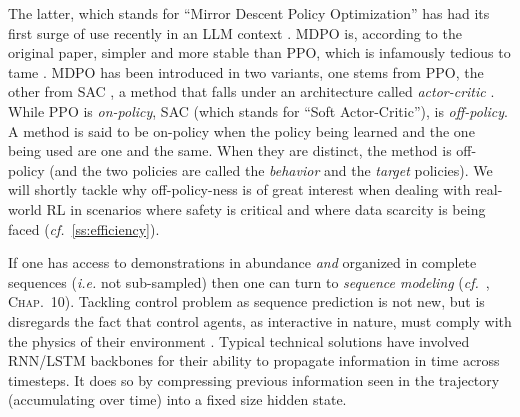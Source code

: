 \documentclass[12pt,a4paper]{article}
\begin{document}
The latter, which stands for ``Mirror Descent Policy Optimization'' has had its first surge of use
recently in an LLM context \cite{Gunter2024-hu}.
MDPO is, according to the original paper, simpler and more stable than PPO, which is infamously
tedious to tame \cite{Engstrom2019-jt, Huang2022-bv, Moalla2024-xq}.
MDPO has been introduced in two variants, one stems from PPO,
the other from SAC \cite{Haarnoja2018-bm, Haarnoja2018-uo},
a method that falls under an architecture called \textit{actor-critic}
\cite{Crites1995-hn, Konda2000-ef, Sutton2001-vh}.
While PPO is \textit{on-policy}, SAC (which stands for ``Soft Actor-Critic''),
is \textit{off-policy}.
A method is said to be on-policy when the policy being learned and the one being used are one and
the same. When they are distinct, the method is off-policy (and the two policies are called the
\textit{behavior} and the \textit{target} policies).
We will shortly tackle why off-policy-ness is of great interest when dealing with real-world RL
in scenarios where safety is critical and where data scarcity is being faced
(\textit{cf.}~\ref{ss:efficiency}).

If one has access to demonstrations in abundance \emph{and} organized in complete sequences 
(\textit{i.e.} not sub-sampled)
then one can turn to \emph{sequence modeling}
(\textit{cf.}~\cite{Goodfellow2016-ev}, \textsc{Chap.}~10).
Tackling control problem as sequence prediction is not new, but is disregards the fact that
control agents, as interactive in nature, must comply with the physics of their environment
\cite{Salzmann2020-jl}. Typical technical solutions have involved RNN/LSTM backbones for
their ability to propagate information in time across timesteps.
It does so by compressing previous information seen in the trajectory (accumulating over time)
into a fixed size hidden state.
\end{document}

